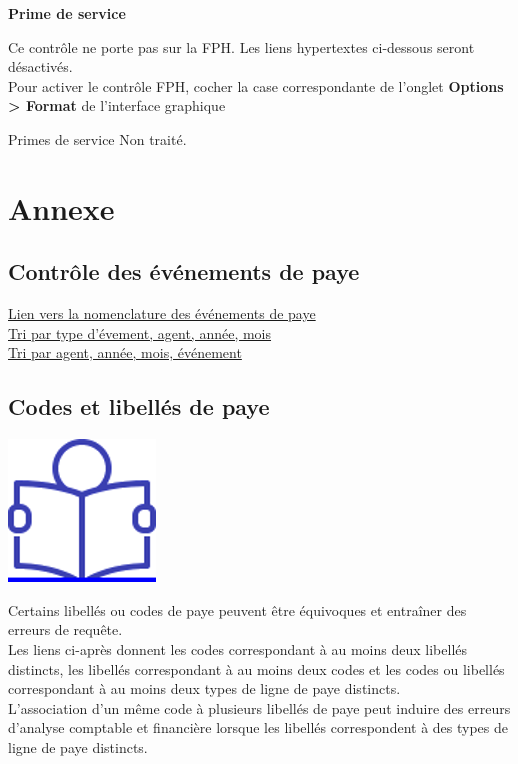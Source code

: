 \textbf{Prime de service}

Ce contrôle ne porte pas sur la FPH. Les liens hypertextes ci-dessous
seront désactivés.\\
Pour activer le contrôle FPH, cocher la case correspondante de l'onglet
\textbf{Options \textgreater{} Format} de l'interface graphique

Primes de service Non traité.

\newpage

\hypertarget{annexe}{%
\section{Annexe}\label{annexe}}

\hypertarget{controle-des-evenements-de-paye}{%
\subsection{Contrôle des événements de
paye}\label{controle-des-evenements-de-paye}}

\href{../Bases/Fiabilite/Evenements.csv}{Lien vers la nomenclature des
événements de paye}\\
\href{../Bases/Fiabilite/Evenements.ind.csv}{Tri par type d'évement, agent,
année, mois}\\
\href{../Bases/Fiabilite/Evenements.mat.csv}{Tri par agent, année, mois,
événement}

\hypertarget{codes-et-libelles-de-paye}{%
\subsection{Codes et libellés de paye}\label{codes-et-libelles-de-paye}}

\href{../Docs/Notices/fiche_individualisation.odt}{\includegraphics{icones/Notice.png}}

Certains libellés ou codes de paye peuvent être équivoques et entraîner
des erreurs de requête.\\
Les liens ci-après donnent les codes correspondant à au moins deux
libellés distincts, les libellés correspondant à au moins deux codes et
les codes ou libellés correspondant à au moins deux types de ligne de
paye distincts.\\
L'association d'un même code à plusieurs libellés de paye peut induire
des erreurs d'analyse comptable et financière lorsque les libellés
correspondent à des types de ligne de paye distincts.

